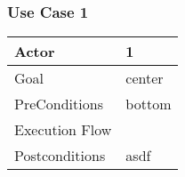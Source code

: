 \documentclass{article}
\begin{document}
	\subsubsection{Use Case 1}
	\begin{tabularx}{\textwidth}{  l  X  }
		\hline
		Actor & 1\\
		\hline
		Goal & center\\
		\hline
		PreConditions & bottom\\
		\hline
		Execution Flow & \\
		\hline
		Postconditions & asdf \\
		\hline
	\end{tabularx}
	
\end{document}
